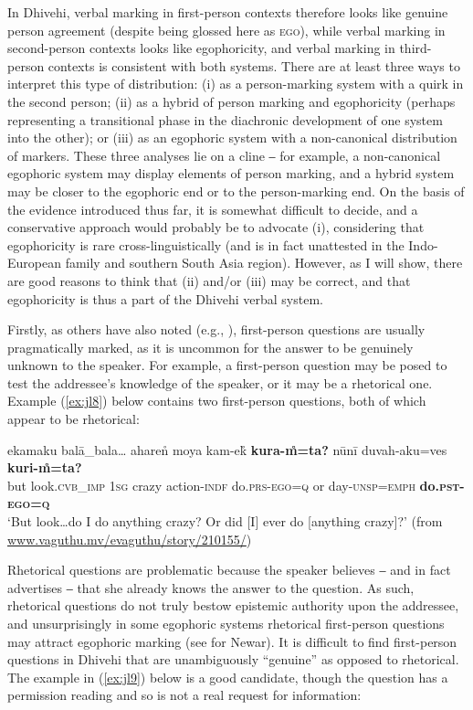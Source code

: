 \documentclass[output=paper]{langsci/langscibook}
\begin{document}
In Dhivehi, verbal marking in first-person contexts therefore looks like genuine person agreement (despite being glossed here as \textsc{ego}), while verbal marking in second-person contexts looks like egophoricity, and verbal marking in third-person contexts is consistent with both systems. There are at least three ways to interpret this type of distribution: (i) as a person-marking system with a quirk in the second person; (ii) as a hybrid of person marking and egophoricity (perhaps representing a transitional phase in the diachronic development of one system into the other); or (iii) as an egophoric system with a non-canonical distribution of markers. These three analyses lie on a cline ‒ for example, a non-canonical egophoric system may display elements of person marking, and a hybrid system may be closer to the egophoric end or to the person-marking end. On the basis of the evidence introduced thus far, it is somewhat difficult to decide, and a conservative approach would probably be to advocate (i), considering that egophoricity is rare cross-linguistically (and is in fact unattested in the Indo-European family and southern South Asia region). However, as I will show, there are good reasons to think that (ii) and/or (iii) may be correct, and that egophoricity is thus a part of the Dhivehi verbal system. 
  
  Firstly, as others have also noted (e.g., \citealt[26--27]{SanRoque2018}), first-person questions are usually pragmatically marked, as it is uncommon for the answer to be genuinely unknown to the speaker. For example, a first-person question may be posed to test the addressee’s knowledge of the speaker, or it may be a rhetorical one. Example (\ref{ex:jl8}) below contains two first-person questions, both of which appear to be rhetorical:
 
 \begin{exe}
	\ex 	\label{ex:jl8}
	\gll ekamaku balā\_bala… aharen̊ moya kam-ek̊ \textbf{kura-m̊=ta?} nūnī duvah-aku=ves \textbf{kuri-m̊=ta?}\\
	but look.\textsc{cvb}\_\textsc{imp} 1\textsc{sg} crazy action-\textsc{indf} do.\textsc{prs}-\textsc{ego}=\textsc{q} or day-\textsc{unsp}=\textsc{emph} \textbf{do.\textsc{pst}-\textsc{ego}=\textsc{q}}\\
	\trans ‘But look…do I do anything crazy? Or did [I] ever do [anything crazy]?’ (from \url{www.vaguthu.mv/evaguthu/story/210155/})
\end{exe}
 
 Rhetorical questions are problematic because the speaker believes ‒ and in fact advertises ‒ that she already knows the answer to the question. As such, rhetorical questions do not truly bestow epistemic authority upon the addressee, and unsurprisingly in some egophoric systems rhetorical first-person questions may attract egophoric marking (see \citealt{HaleWatters1973} for Newar). It is difficult to find first-person questions in Dhivehi that are unambiguously “genuine” as opposed to rhetorical. The example in (\ref{ex:jl9}) below is a good candidate, though the question has a permission reading and so is not a real request for information:
 
\end{document}

